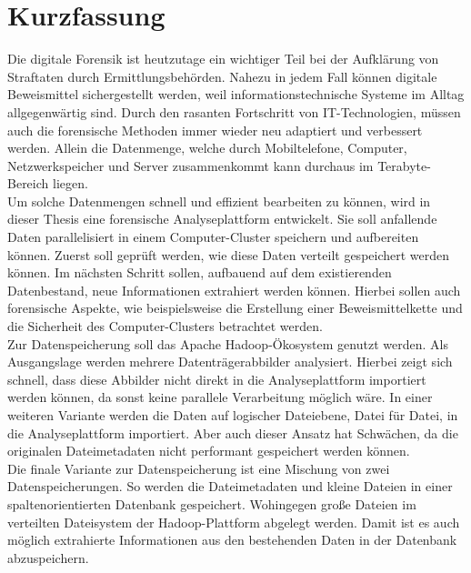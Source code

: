 %
\section*{Kurzfassung}
Die digitale Forensik ist heutzutage ein wichtiger Teil bei der Aufklärung von Straftaten durch Ermittlungsbehörden. Nahezu in jedem Fall können digitale Beweismittel sichergestellt werden, weil informationstechnische Systeme im Alltag allgegenwärtig sind. Durch den rasanten Fortschritt von IT-Technologien, müssen auch die forensische Methoden immer wieder neu adaptiert und verbessert werden. Allein die Datenmenge, welche durch Mobiltelefone, Computer, Netzwerkspeicher und Server zusammenkommt kann durchaus im Terabyte-Bereich liegen.\\

\noindent
Um solche Datenmengen schnell und effizient bearbeiten zu können, wird in dieser Thesis eine forensische Analyseplattform entwickelt. Sie soll anfallende Daten parallelisiert in einem Computer-Cluster speichern und aufbereiten können. Zuerst soll geprüft werden, wie diese Daten verteilt gespeichert werden können. Im nächsten Schritt sollen, aufbauend auf dem existierenden Datenbestand, neue Informationen extrahiert werden können. Hierbei sollen auch forensische Aspekte, wie beispielsweise die Erstellung einer Beweismittelkette und die Sicherheit des Computer-Clusters betrachtet werden.\\

\noindent
Zur Datenspeicherung soll das Apache Hadoop\textsuperscript{\textregistered}-Ökosystem genutzt werden. Als Ausgangslage werden mehrere Datenträgerabbilder analysiert. Hierbei zeigt sich schnell, dass diese Abbilder nicht direkt in die Analyseplattform importiert werden können, da sonst keine parallele Verarbeitung möglich wäre. In einer weiteren Variante werden die Daten auf logischer Dateiebene, Datei für Datei, in die Analyseplattform importiert. Aber auch dieser Ansatz hat Schwächen, da die originalen Dateimetadaten nicht performant gespeichert werden können.\\
Die finale Variante zur Datenspeicherung ist eine Mischung von zwei Datenspeicherungen. So werden die Dateimetadaten und kleine Dateien in einer spaltenorientierten Datenbank gespeichert. Wohingegen große Dateien im verteilten Dateisystem der Hadoop-Plattform abgelegt werden. Damit ist es auch möglich extrahierte Informationen aus den bestehenden Daten in der Datenbank abzuspeichern.\\

